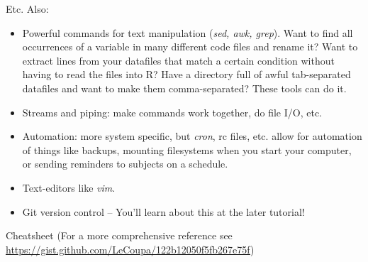 \documentclass{beamer}
\begin{document}
\begin{frame}{Etc.}
Also:
\begin{itemize}
\item Powerful commands for text manipulation (\emph{sed, awk, grep}). Want to find all occurrences of a variable in many different code files and rename it? Want to extract lines from your datafiles that match a certain condition without having to read the files into R? Have a directory full of awful tab-separated datafiles and want to make them comma-separated? These tools can do it. 
\item Streams and piping: make commands work together, do file I/O, etc.   
\item Automation: more system specific, but \emph{cron}, rc files, etc. allow for automation of things like backups, mounting filesystems when you start your computer, or sending reminders to subjects on a schedule.
\item Text-editors like \emph{vim}.
\item Git version control -- You'll learn about this at the later tutorial!
\end{itemize}
\end{frame}

\begin{frame}{Cheatsheet}
\centering
{}
(For a more comprehensive reference see {\color{blue} \url{https://gist.github.com/LeCoupa/122b12050f5fb267e75f}})
\end{frame}
\end{document}
